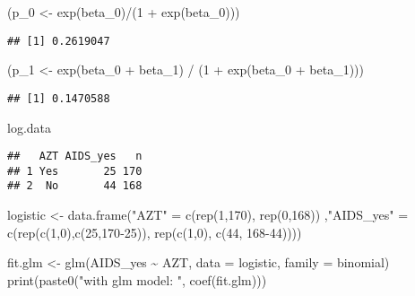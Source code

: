 \documentclass[
]{article}
\newenvironment{Shaded}{\begin{snugshade}}{\end{snugshade}}
\newcommand{\AttributeTok}[1]{\textcolor[rgb]{0.77,0.63,0.00}{#1}}
\newcommand{\DecValTok}[1]{\textcolor[rgb]{0.00,0.00,0.81}{#1}}
\newcommand{\FunctionTok}[1]{\textcolor[rgb]{0.00,0.00,0.00}{#1}}
\newcommand{\NormalTok}[1]{#1}
\newcommand{\OtherTok}[1]{\textcolor[rgb]{0.56,0.35,0.01}{#1}}
\newcommand{\SpecialCharTok}[1]{\textcolor[rgb]{0.00,0.00,0.00}{#1}}
\newcommand{\StringTok}[1]{\textcolor[rgb]{0.31,0.60,0.02}{#1}}
\begin{document}
\begin{Shaded}
\begin{Highlighting}[]
\NormalTok{(p\_0 }\OtherTok{\textless{}{-}} \FunctionTok{exp}\NormalTok{(beta\_0)}\SpecialCharTok{/}\NormalTok{(}\DecValTok{1} \SpecialCharTok{+} \FunctionTok{exp}\NormalTok{(beta\_0)))}
\end{Highlighting}
\end{Shaded}

\begin{verbatim}
## [1] 0.2619047
\end{verbatim}

\begin{Shaded}
\begin{Highlighting}[]
\NormalTok{(p\_1 }\OtherTok{\textless{}{-}} \FunctionTok{exp}\NormalTok{(beta\_0 }\SpecialCharTok{+}\NormalTok{ beta\_1) }\SpecialCharTok{/}\NormalTok{ (}\DecValTok{1} \SpecialCharTok{+} \FunctionTok{exp}\NormalTok{(beta\_0 }\SpecialCharTok{+}\NormalTok{ beta\_1)))}
\end{Highlighting}
\end{Shaded}

\begin{verbatim}
## [1] 0.1470588
\end{verbatim}

\begin{Shaded}
\begin{Highlighting}[]
\NormalTok{log.data}
\end{Highlighting}
\end{Shaded}

\begin{verbatim}
##   AZT AIDS_yes   n
## 1 Yes       25 170
## 2  No       44 168
\end{verbatim}

\begin{Shaded}
\begin{Highlighting}[]
\NormalTok{logistic }\OtherTok{\textless{}{-}} \FunctionTok{data.frame}\NormalTok{(}\StringTok{"AZT"} \OtherTok{=} \FunctionTok{c}\NormalTok{(}\FunctionTok{rep}\NormalTok{(}\DecValTok{1}\NormalTok{,}\DecValTok{170}\NormalTok{), }\FunctionTok{rep}\NormalTok{(}\DecValTok{0}\NormalTok{,}\DecValTok{168}\NormalTok{))}
\NormalTok{                       ,}\StringTok{"AIDS\_yes"} \OtherTok{=} \FunctionTok{c}\NormalTok{(}\FunctionTok{rep}\NormalTok{(}\FunctionTok{c}\NormalTok{(}\DecValTok{1}\NormalTok{,}\DecValTok{0}\NormalTok{),}\FunctionTok{c}\NormalTok{(}\DecValTok{25}\NormalTok{,}\DecValTok{170{-}25}\NormalTok{)), }\FunctionTok{rep}\NormalTok{(}\FunctionTok{c}\NormalTok{(}\DecValTok{1}\NormalTok{,}\DecValTok{0}\NormalTok{), }\FunctionTok{c}\NormalTok{(}\DecValTok{44}\NormalTok{, }\DecValTok{168{-}44}\NormalTok{))))}

\NormalTok{fit.glm }\OtherTok{\textless{}{-}} \FunctionTok{glm}\NormalTok{(AIDS\_yes }\SpecialCharTok{\textasciitilde{}}\NormalTok{ AZT, }\AttributeTok{data =}\NormalTok{ logistic, }\AttributeTok{family =}\NormalTok{ binomial)}
\FunctionTok{print}\NormalTok{(}\FunctionTok{paste0}\NormalTok{(}\StringTok{"with glm model: "}\NormalTok{, }\FunctionTok{coef}\NormalTok{(fit.glm)))}
\end{Highlighting}
\end{Shaded}
\end{document}
